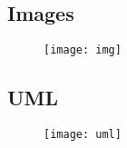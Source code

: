 \subsection{Images}

\begin{figure}[H]
\texttt{[image: img]}
\centering
\end{figure}

\subsection{UML}
\begin{figure}[H]
    \texttt{[image: uml]}
\end{figure}
